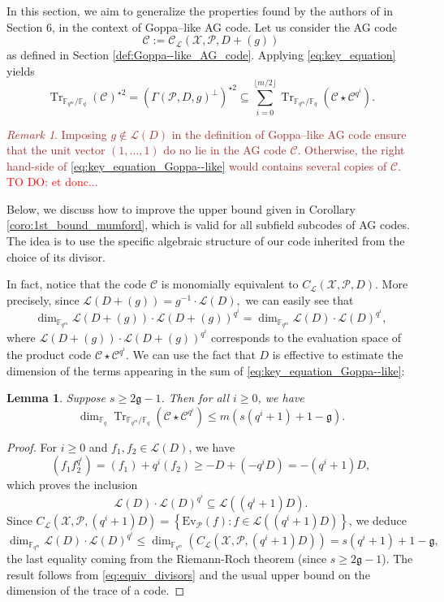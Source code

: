 \documentclass[a4paper]{article}
\newtheorem{lemma}[thm]{Lemma}
\theoremstyle{definition}
\theoremstyle{remark}
\newtheorem{remark}{Remark}
\newcommand{\calP}{\mathcal{P}}
\newcommand{\calL}{\mathcal{L}}
\newcommand{\calC}{\mathcal{C}}
\newcommand{\calX}{\mathcal{X}}
\newcommand{\fqm}{\mathbb{F}_{q^m}}
\newcommand{\fq}{\mathbb{F}_{q}}
\newcommand{\Tr}[1]{\operatorname{Tr}_{\mathbb{F}_{q^m}/\fq}\left(#1\right)}
\newcommand{\set}[1]{\left\{#1\right\}}
\newcommand\TODO[1]{\textcolor{red}{TO DO: #1}}
\newcommand\mathieu[1]{\textcolor{brown}{#1}}
\begin{document}
In this section, we aim to generalize the properties found by the authors of \cite{MT21} in Section 6, in the context of Goppa--like AG code. Let us consider the AG code 
$$\calC := \calC_{\calL}(\calX,\calP,D+(g))$$
as defined in Section \ref{def:Goppa--like_AG_code}. Applying \eqref{eq:key_equation} yields   
\begin{equation} \label{eq:key_equation_Goppa--like} 
\Tr{\calC}^{\star 2} = (\Gamma(\calP,D,g)^{\perp})^{\star2} \subseteq \sum\limits_{i=0}^{\lfloor{m/2} \rfloor} \Tr{\calC\star \calC^{q^i}}.
\end{equation}

\mathieu{
\begin{remark} \label{rq:g_notin_L(D)}
Imposing $g \notin \calL(D)$ in the definition of Goppa--like AG code ensure that the unit vector $(1,\dots,1)$ do no lie in the AG code $\calC$. Otherwise, the right hand-side of \eqref{eq:key_equation_Goppa--like} would contains several copies of $\calC$. \\
\TODO{et donc...} 
\end{remark}}


Below, we discuss how to improve the upper bound given in Corollary \ref{coro:1st_bound_mumford}, which is valid for all subfield subcodes of AG codes. The idea is to use the specific algebraic structure of our code inherited from the choice of its divisor.

\noindent In fact, notice that the code $\calC$ is monomially equivalent to $C_{\calL}(\calX,\calP,D)$. 
More precisely, since $\calL(D+(g)) = g^{-1} \cdot \calL(D),$
we can easily see that
\begin{equation} \label{eq:equiv_divisors}
\dim_{\fqm} \calL(D+(g))\cdot \calL(D+(g))^{q^i} = \dim_{\fqm} \calL(D)\cdot \calL(D)^{q^i},
\end{equation}
where $\calL(D+(g))\cdot \calL(D+(g))^{q^i}$ corresponds to the evaluation space of the product code $\calC \star \calC^{q^i}$. We can use the fact that $D$ is effective to estimate the dimension of the terms appearing in the sum of \eqref{eq:key_equation_Goppa--like}:


\begin{lemma} \label{lem:bound_dim_Tr(C*C^q^i)}
  Suppose $s \geq 2\mathfrak{g}-1$. Then for all $i \geq 0$, we have 
   $$\dim_{\fq} \Tr{\calC\star \calC^{q^i}} \leq m\left(s\left(q^i+1\right)+1-\mathfrak{g}\right).$$
\end{lemma}

\begin{proof}
For $i \geq 0$ and $f_1,f_2 \in \calL(D)$, we have 
$$(f_1f_2^{q^i}) = (f_1)+q^i(f_2) \geq -D +(-q^iD) = -(q^i+1)D,$$
which proves the inclusion
$$ \calL(D)\cdot \calL(D)^{q^i} \subseteq \calL((q^i+1)D).$$
Since $C_{\calL}(\calX,\calP,(q^i+1)D) = \set{\mathrm{Ev}_{\calP}(f) : f \in \calL((q^i+1)D)}$, we deduce 
$$ \dim_{\fqm} \calL(D) \cdot \calL(D)^{q^i} \leq \dim_{\fqm}\left(C_{\calL}(\calX,\calP,(q^i+1)D)\right) = s(q^i+1)+1-\mathfrak{g},$$
the last equality coming from the Riemann-Roch theorem (since $s \geq 2\mathfrak{g}-1$). The result follows from \eqref{eq:equiv_divisors} and the usual upper bound on the dimension of the trace of a code. 
\end{proof}
\end{document}
